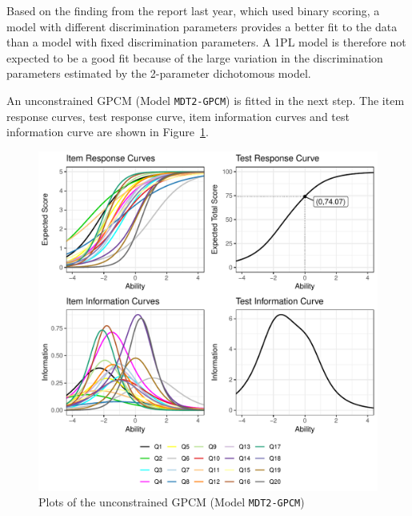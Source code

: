\documentclass[a4paper]{report}
\begin{document}
Based on the finding from the report last year, which used binary scoring, a model with different discrimination parameters provides a better fit to the data than a model with fixed discrimination parameters. A 1PL model is therefore not expected to be a good fit because of the large variation in the discrimination parameters estimated by the 2-parameter dichotomous model. 

An unconstrained GPCM (Model \texttt{MDT2-GPCM}) is fitted in the next step. The item response curves, test response curve, item information curves and test information curve are shown in Figure~\ref{fig:IRT_pre17_GPCM}. 

\begin{figure}[H]
  \centering
  \includegraphics[width=\linewidth]{fig/IRT_pre17_GPCM.pdf}
  \caption{\label{fig:IRT_pre17_GPCM}Plots of the unconstrained GPCM (Model \texttt{MDT2-GPCM})}
\end{figure}
\end{document}
